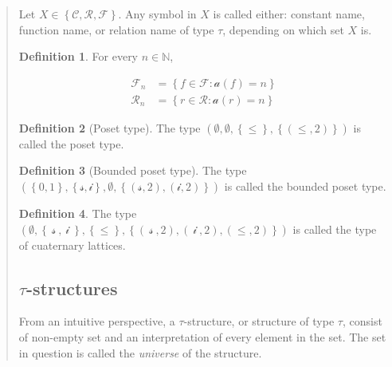\documentclass[a4paper, 12pt]{article}
\theoremstyle{definition}
\theoremstyle{definition}
\theoremstyle{definition}
\newtheorem{definition}{Definition}
\begin{document}
\begin{quote}
Let $X \in \left\{ \mathcal{C}, \mathcal{R}, \mathcal{F} \right\} $. Any symbol
in $X$ is called either: constant name, function name, or relation name of type
$\tau$, depending on which set $X$ is.

\begin{definition}
    For every $n \in \mathbb{N}$, 

    \begin{align*}
        \mathcal{F}_n &= \left\{ f \in \mathcal{F} : \mathcal{a}(f) = n \right\} \\
        \mathcal{R}_n &= \left\{ r \in \mathcal{R} : \mathcal{a}(r) = n \right\} 
    \end{align*}
\end{definition}

\begin{definition}[Poset type]
    The type $(\emptyset, \emptyset, \left\{ \leq \right\}, \left\{ (\leq, 2) \right\} ) $ is called 
    the poset type.
\end{definition}

\begin{definition}[Bounded poset type]
    The type $\left( \left\{ 0, 1 \right\}, \left\{ \mathcal{s}, \mathcal{i} \right\},  \emptyset, \left\{ (\mathcal{s}, 2), (\mathcal{i}, 2) \right\}    \right) $ is called the bounded poset type.
\end{definition}

\begin{definition}
    The type $\left( \emptyset, \left\{ ~\mathcal{s}~, ~\mathcal{i}~ \right\}, \left\{ \leq \right\}, \left\{ (~\mathcal{s}~, 2), (~\mathcal{i}~, 2), (\leq, 2) \right\}    \right) $ is called the type of cuaternary lattices.
\end{definition}

\subsection{$\tau$-structures}

From an intuitive perspective, a $\tau$-structure, or structure of type $\tau$,
consist of non-empty set and an interpretation of every element in the 
set. The set in question is called the \textit{universe} of the structure. 


\end{quote}
\end{document}
